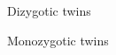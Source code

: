 

\begin{description}[CABR]
\item[DZ]{Dizygotic twins}
\item[MZ]{Monozygotic twins}
\end{description}
